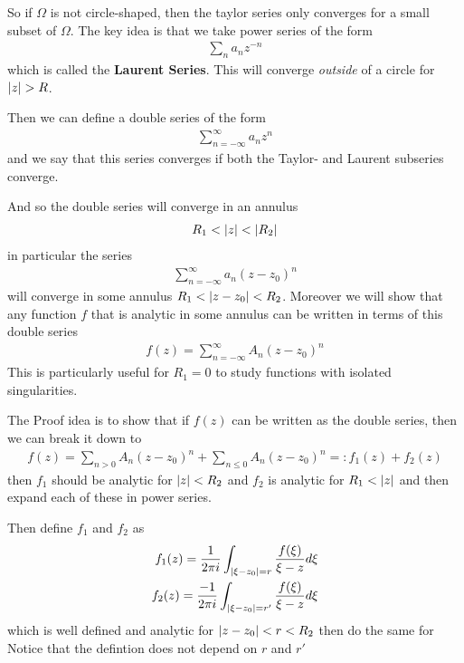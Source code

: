 So if $\Omega$ is not circle-shaped, then the taylor series only converges for a small subset of $\Omega$. The key idea is that we take power series of the form
\begin{align*}
	\sum_{n}a_n z^{-n}
\end{align*}
which is called the \textbf{Laurent Series}. This will converge \emph{outside} of a circle for $\vert z\vert > R$.

Then we can define a double series of the form
\begin{align*}
	\sum_{n = - \infty}^{\infty} a_n z^{n}
\end{align*}
and we say that this series converges if both the Taylor- and Laurent subseries converge.

And so the double series will converge in an annulus
\begin{align*}
	R_1 < \vert z\vert < \vert R_2\vert
\end{align*}
in particular the series 
\begin{align*}
	\sum_{n = -\infty}^{\infty}a_n (z - z_0)^{n}
\end{align*}
will converge in some annulus $R_1 < \vert z - z_0\vert < R_2$. Moreover we will show that any function $f$ that is analytic in some annulus can be written in terms of this double series
\begin{align*}
	f(z) = \sum_{n = -\infty}^{\infty} A_n(z - z_0)^{n}
\end{align*}
This is particularly useful for $R_1 = 0$ to study functions with isolated singularities.

The Proof idea is to show that if $f(z)$ can be written as the double series, then we can break it down to
\begin{align*}
	f(z) = \sum_{n > 0}A_n (z - z_0)^{n} + \sum_{n \leq 0}A_n(z - z_0)^{n} =: f_1(z) + f_2(z)
\end{align*}
then $f_1$ should be analytic for $\vert z\vert < R_2$ and $f_2$ is analytic for $R_1 < \vert z\vert$ and then expand each of these in power series.

Then define $f_1$ and $f_2$  as
\begin{align*}
	f_1(z) = \frac{1}{2\pi i} \int_{\vert\xi - z_0\vert = r} \frac{f(\xi)}{\xi - z} d \xi\\
	f_2(z) = \frac{-1}{2\pi i} \int_{\vert\xi - z_0\vert = r'} \frac{f(\xi)}{\xi - z} d \xi
\end{align*}
which is well defined and analytic for $\vert z - z_0\vert < r < R_2$ then do the same for
Notice that the defintion does not depend on $r$ and $r'$

